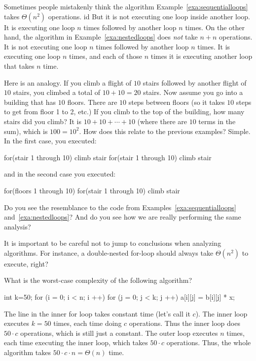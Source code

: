 Sometimes people mistakenly think the algorithm Example~\ref{exa:sequentialloops} 
takes $\Theta(n^2)$ operations.  id
But it is not executing one loop inside another loop.  
It is executing one loop $n$ times followed by another loop $n$ times.
On the other hand, the algorithm in Example~\ref{exa:nestedloops}
does {\em not} take $n+n$ operations.  
It is not executing one loop $n$ times followed by another loop $n$ times.
It is executing one loop $n$ times, and each of those $n$ times it is executing another
loop that takes $n$ time.

Here is an analogy.  If you climb a flight of $10$ stairs followed by another flight of $10$ 
stairs, you climbed a total of $10+10=20$ stairs.
Now assume you go into a building that has $10$ floors.  There are $10$ steps between
floors (so it takes $10$ steps to get from floor 1 to 2, etc.)  If you climb to the 
top of the building, how many stairs did you climb? It is $10+10+\cdots+10$ (where there are
$10$ terms in the sum), which is $100=10^2$.  How does this relate to the previous examples?
Simple.  In the first case, you executed:
\begin{code}
    for(stair 1 through 10)
        climb stair
    for(stair 1 through 10)
        climb stair
\end{code}
and in the second case you executed:
\begin{code}
    for(floors 1 through 10)
        for(stair 1 through 10)
            climb stair
\end{code}
Do you see the resemblance to the code from 
Examples~\ref{exa:sequentialloops} and~\ref{exa:nestedloops}?
And do you see how we are really performing the same analysis?
 
It is important to be careful not to jump to conclusions when analyzing algorithms.  
For instance, a double-nested for-loop should always take $\Theta(n^2)$ to execute, right?
\begin{exer}
What is the worst-case complexity of the following algorithm?
\begin{code}
    int k=50;
    for (i = 0; i < n; i ++) {
        for (j = 0; j < k; j ++) {
            a[i][j] = b[i][j] * x;
        }
    }
\end{code} 
\vspace*{2in}
\begin{answer}
The line in the inner for loop takes constant time (let's call it $c$).
The inner loop executes $k=50$ times, each time doing $c$ operations.
Thus the inner loop does $50\cdot c$ operations, which is still just a constant.
The outer loop executes $n$ times, each time executing the inner loop, which takes $50\cdot c$ operations.
Thus, the whole algorithm takes $50\cdot c\cdot n=\Theta(n)$ time.
\end{answer}
\end{exer}

